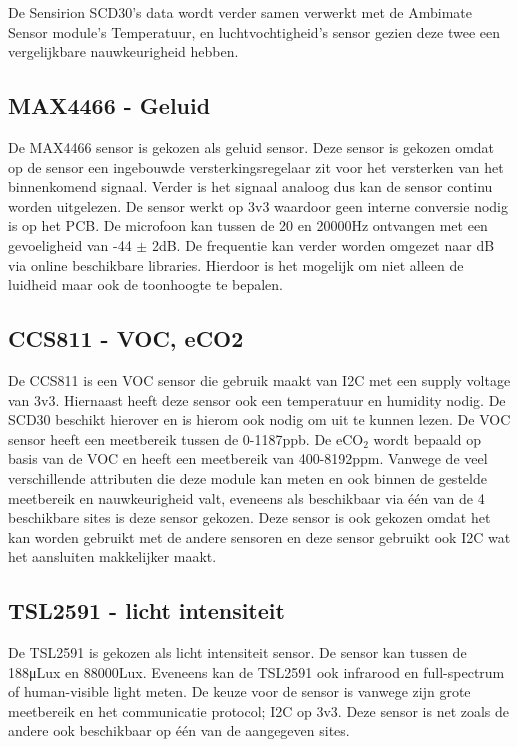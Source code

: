 De Sensirion SCD30's data wordt verder samen verwerkt met de Ambimate Sensor module's Temperatuur, en luchtvochtigheid's sensor gezien deze twee een vergelijkbare nauwkeurigheid hebben.

\subsection{MAX4466 - Geluid}
\label{sec:max}
De MAX4466 sensor is gekozen als geluid sensor. Deze sensor is gekozen omdat op de sensor een ingebouwde versterkingsregelaar zit voor het versterken van het binnenkomend signaal. Verder is het signaal analoog dus kan de sensor continu worden uitgelezen. De sensor werkt op 3v3 waardoor geen interne conversie nodig is op het PCB. De microfoon kan tussen de 20 en 20000Hz ontvangen met een gevoeligheid van -44 $\pm$ 2dB. De frequentie kan verder worden omgezet naar dB via online beschikbare libraries. Hierdoor is het mogelijk om niet alleen de luidheid maar ook de toonhoogte te bepalen.

\subsection{CCS811 - VOC, eCO2}
\label{sec:mate}
De CCS811 is een VOC sensor die gebruik maakt van I2C met een supply voltage van 3v3. Hiernaast heeft deze sensor ook een temperatuur en humidity nodig. De SCD30 beschikt hierover en  is hierom ook nodig om uit te kunnen lezen. De VOC sensor heeft een meetbereik tussen de 0-1187ppb. De eCO$_2$ wordt bepaald op basis van de VOC en heeft een meetbereik van 400-8192ppm. Vanwege de veel verschillende attributen die deze module kan meten en ook binnen de gestelde meetbereik en nauwkeurigheid valt, eveneens als beschikbaar via één van de 4 beschikbare sites is deze sensor gekozen. Deze sensor is ook gekozen omdat het kan worden gebruikt met de andere sensoren en deze sensor gebruikt ook I2C wat het aansluiten makkelijker maakt.\\

\subsection{TSL2591 - licht intensiteit}
\label{sec:TSL}
De TSL2591 is gekozen als licht intensiteit sensor. De sensor kan tussen de 188\si{\micro Lux} en 88000\si{Lux}. Eveneens kan de TSL2591 ook infrarood en full-spectrum of human-visible light meten. De keuze voor de sensor is vanwege zijn grote meetbereik en het communicatie protocol; I2C op 3v3. Deze sensor is net zoals de andere ook beschikbaar op één van de aangegeven sites.

